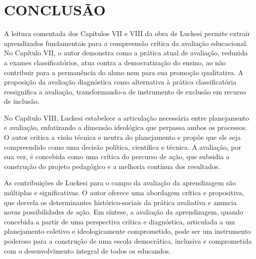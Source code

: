 
\chapter{CONCLUSÃO}
\label{chap:conclusao}

A leitura comentada dos Capítulos VII e VIII da obra de Luckesi permite extrair aprendizados fundamentais para a compreensão crítica da avaliação educacional. No Capítulo VII, o autor demonstra como a prática atual de avaliação, reduzida a exames classificatórios, atua contra a democratização do ensino, ao não contribuir para a permanência do aluno nem para sua promoção qualitativa. A proposição da avaliação diagnóstica como alternativa à prática classificatória ressignifica a avaliação, transformando-a de instrumento de exclusão em recurso de inclusão.

No Capítulo VIII, Luckesi estabelece a articulação necessária entre planejamento e avaliação, enfatizando a dimensão ideológica que perpassa ambos os processos. O autor critica a visão técnica e neutra do planejamento e propõe que ele seja compreendido como uma decisão política, científica e técnica. A avaliação, por sua vez, é concebida como uma crítica do percurso de ação, que subsidia a construção do projeto pedagógico e a melhoria contínua dos resultados.

As contribuições de Luckesi para o campo da avaliação da aprendizagem são múltiplas e significativas. O autor oferece uma abordagem crítica e propositiva, que desvela os determinantes histórico-sociais da prática avaliativa e anuncia novas possibilidades de ação. Em síntese, a avaliação da aprendizagem, quando concebida a partir de uma perspectiva crítica e diagnóstica, articulada a um planejamento coletivo e ideologicamente comprometido, pode ser um instrumento poderoso para a construção de uma escola democrática, inclusiva e comprometida com o desenvolvimento integral de todos os educandos.

